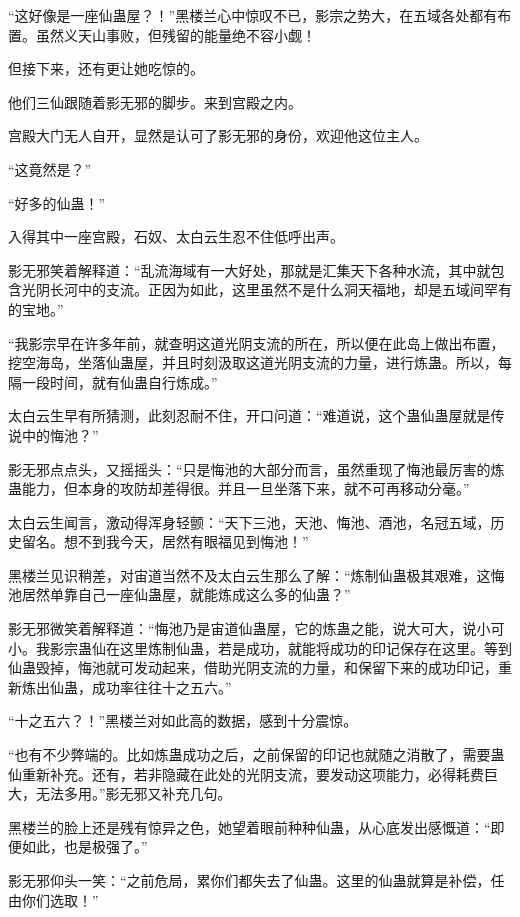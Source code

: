 \begin{this_body}
“这好像是一座仙蛊屋？！”黑楼兰心中惊叹不已，影宗之势大，在五域各处都有布置。虽然义天山事败，但残留的能量绝不容小觑！

但接下来，还有更让她吃惊的。

他们三仙跟随着影无邪的脚步。来到宫殿之内。

宫殿大门无人自开，显然是认可了影无邪的身份，欢迎他这位主人。

“这竟然是？”

“好多的仙蛊！”

入得其中一座宫殿，石奴、太白云生忍不住低呼出声。

影无邪笑着解释道：“乱流海域有一大好处，那就是汇集天下各种水流，其中就包含光阴长河中的支流。正因为如此，这里虽然不是什么洞天福地，却是五域间罕有的宝地。”

“我影宗早在许多年前，就查明这道光阴支流的所在，所以便在此岛上做出布置，挖空海岛，坐落仙蛊屋，并且时刻汲取这道光阴支流的力量，进行炼蛊。所以，每隔一段时间，就有仙蛊自行炼成。”

太白云生早有所猜测，此刻忍耐不住，开口问道：“难道说，这个蛊仙蛊屋就是传说中的悔池？”

影无邪点点头，又摇摇头：“只是悔池的大部分而言，虽然重现了悔池最厉害的炼蛊能力，但本身的攻防却差得很。并且一旦坐落下来，就不可再移动分毫。”

太白云生闻言，激动得浑身轻颤：“天下三池，天池、悔池、酒池，名冠五域，历史留名。想不到我今天，居然有眼福见到悔池！”

黑楼兰见识稍差，对宙道当然不及太白云生那么了解：“炼制仙蛊极其艰难，这悔池居然单靠自己一座仙蛊屋，就能炼成这么多的仙蛊？”

影无邪微笑着解释道：“悔池乃是宙道仙蛊屋，它的炼蛊之能，说大可大，说小可小。我影宗蛊仙在这里炼制仙蛊，若是成功，就能将成功的印记保存在这里。等到仙蛊毁掉，悔池就可发动起来，借助光阴支流的力量，和保留下来的成功印记，重新炼出仙蛊，成功率往往十之五六。”

“十之五六？！”黑楼兰对如此高的数据，感到十分震惊。

“也有不少弊端的。比如炼蛊成功之后，之前保留的印记也就随之消散了，需要蛊仙重新补充。还有，若非隐藏在此处的光阴支流，要发动这项能力，必得耗费巨大，无法多用。”影无邪又补充几句。

黑楼兰的脸上还是残有惊异之色，她望着眼前种种仙蛊，从心底发出感慨道：“即便如此，也是极强了。”

影无邪仰头一笑：“之前危局，累你们都失去了仙蛊。这里的仙蛊就算是补偿，任由你们选取！”

\end{this_body}

